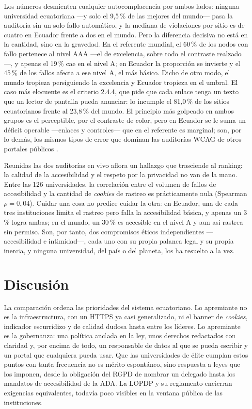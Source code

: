 \documentclass[pdflatex,sn-basic,Numbered]{sn-jnl}
\theoremstyle{thmstyleone}
\theoremstyle{thmstyletwo}
\theoremstyle{thmstylethree}
\begin{document}
Los números desmienten cualquier autocomplacencia por ambos lados: ninguna universidad ecuatoriana ---y solo el 9,5\,\% de las mejores del mundo--- pasa la auditoría sin un solo fallo automático, y la mediana de violaciones por sitio es de cuatro en Ecuador frente a dos en el mundo. Pero la diferencia decisiva no está en la cantidad, sino en la gravedad. En el referente mundial, el 60\,\% de los nodos con fallo pertenece al nivel AAA ---el de excelencia, sobre todo el contraste realzado---, y apenas el 19\,\% cae en el nivel A; en Ecuador la proporción se invierte y el 45\,\% de los fallos afecta a ese nivel A, el más básico. Dicho de otro modo, el mundo tropieza persiguiendo la excelencia y Ecuador tropieza en el umbral. El caso más elocuente es el criterio 2.4.4, que pide que cada enlace tenga un texto que un lector de pantalla pueda anunciar: lo incumple el 81,0\,\% de los sitios ecuatorianos frente al 23,8\,\% del mundo. El principio más golpeado en ambos grupos es el perceptible, por el contraste de color, pero en Ecuador se le suma un déficit operable ---enlaces y controles--- que en el referente es marginal; son, por lo demás, los mismos tipos de error que dominan las auditorías WCAG de otros portales públicos \citep{iniesto2025service}.

Reunidas las dos auditorías en vivo aflora un hallazgo que trasciende al ranking: la calidad de la accesibilidad y el respeto por la privacidad no van de la mano. Entre las 126 universidades, la correlación entre el volumen de fallos de accesibilidad y la cantidad de \emph{cookies} de rastreo es prácticamente nula (Spearman $\rho=0{,}04$). Cuidar una cosa no predice cuidar la otra: en Ecuador, una de cada tres instituciones limita el rastreo pero falla la accesibilidad básica, y apenas un 3\,\% logra ambas; en el mundo, un 30\,\% es accesible en el nivel A y aun así rastrea sin permiso. Son, por tanto, dos compromisos éticos independientes ---accesibilidad e intimidad---, cada uno con su propia palanca legal y su propia inercia, y ninguna universidad, del país o del planeta, los ha resuelto a la vez.

\section{Discusi\'on}\label{sec:discusion}
La comparación ordena las prioridades del sistema ecuatoriano. Lo apremiante no es la infraestructura, con un HTTPS ya casi generalizado, ni el banner de \emph{cookies}, indicador escurridizo y de calidad dudosa hasta entre los líderes. Lo apremiante es la gobernanza: una política anclada en la ley, unos derechos redactados con claridad y, por encima de todo, un responsable de datos al que se pueda escribir y un portal que cualquiera pueda usar. Que las universidades de élite cumplan estos puntos con tanta frecuencia no es mérito espontáneo, sino respuesta a leyes que los imponen, desde la obligación del RGPD de nombrar un delegado hasta los mandatos de accesibilidad de la ADA. La LOPDP y su reglamento encierran exigencias equivalentes, todavía poco visibles en la ventana pública de las instituciones.
\end{document}
